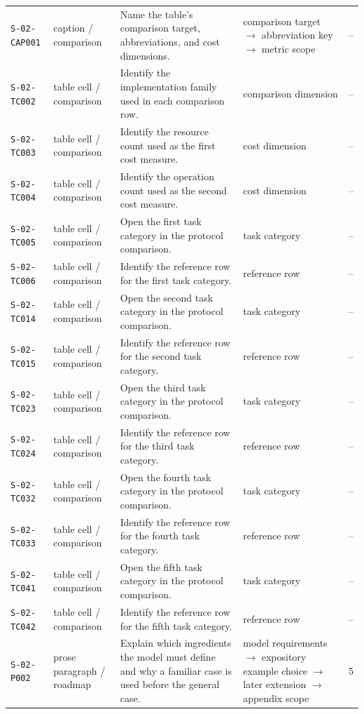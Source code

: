 \documentclass[10pt]{article}
\begin{document}
\begin{longtable}{@{}p{}p{}p{}p{}p{}@{}}
\texttt{S-02-CAP001}&caption / comparison&Name the table's comparison target, abbreviations, and cost dimensions.&comparison target $\rightarrow$ abbreviation key $\rightarrow$ metric scope&--\\
\texttt{S-02-TC002}&table cell / comparison&Identify the implementation family used in each comparison row.&comparison dimension&--\\
\texttt{S-02-TC003}&table cell / comparison&Identify the resource count used as the first cost measure.&cost dimension&--\\
\texttt{S-02-TC004}&table cell / comparison&Identify the operation count used as the second cost measure.&cost dimension&--\\
\texttt{S-02-TC005}&table cell / comparison&Open the first task category in the protocol comparison.&task category&--\\
\texttt{S-02-TC006}&table cell / comparison&Identify the reference row for the first task category.&reference row&--\\
\texttt{S-02-TC014}&table cell / comparison&Open the second task category in the protocol comparison.&task category&--\\
\texttt{S-02-TC015}&table cell / comparison&Identify the reference row for the second task category.&reference row&--\\
\texttt{S-02-TC023}&table cell / comparison&Open the third task category in the protocol comparison.&task category&--\\
\texttt{S-02-TC024}&table cell / comparison&Identify the reference row for the third task category.&reference row&--\\
\texttt{S-02-TC032}&table cell / comparison&Open the fourth task category in the protocol comparison.&task category&--\\
\texttt{S-02-TC033}&table cell / comparison&Identify the reference row for the fourth task category.&reference row&--\\
\texttt{S-02-TC041}&table cell / comparison&Open the fifth task category in the protocol comparison.&task category&--\\
\texttt{S-02-TC042}&table cell / comparison&Identify the reference row for the fifth task category.&reference row&--\\
\texttt{S-02-P002}&prose paragraph / roadmap&Explain which ingredients the model must define and why a familiar case is used before the general case.&model requirements $\rightarrow$ expository example choice $\rightarrow$ later extension $\rightarrow$ appendix scope&5\\

\end{longtable}
\end{document}
